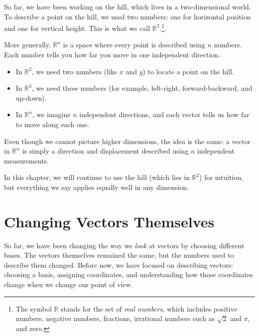 \documentclass[11pt,openany]{book}
\theoremstyle{definition}
\begin{document}
    \medskip
    
    So far, we have been working on the hill, which lives in a two-dimensional world. 
    To describe a point on the hill, we used two numbers: one for horizontal position 
    and one for vertical height. This is what we call $\mathbb{R}^2$.\footnote{The symbol 
$\mathbb{R}$ stands for the set of \textit{real numbers}, which includes positive 
numbers, negative numbers, fractions, irrational numbers such as $\sqrt{2}$ and $\pi$, 
and zero.}.

\medskip

More generally, $\mathbb{R}^n$ is a space where every point is described using $n$ 
numbers. Each number tells you how far you move in one independent direction.

\medskip

\begin{itemize}
  \item In $\mathbb{R}^2$, we need two numbers (like $x$ and $y$) to locate a point on the hill.
  \item In $\mathbb{R}^3$, we need three numbers (for example, left-right, forward-backward, and up-down).
  \item In $\mathbb{R}^n$, we imagine $n$ independent directions, and each vector tells us how far to move along each one.
\end{itemize}

\medskip

Even though we cannot picture higher dimensions, the idea is the same: 
a vector in $\mathbb{R}^n$ is simply a direction and displacement described using $n$ independent measurements.

\medskip

In this chapter, we will continue to use the hill (which lies in $\mathbb{R}^2$) 
for intuition, but everything we say applies equally well in any dimension.

\section{Changing Vectors Themselves}

So far, we have been changing the way we \textit{look} at vectors by choosing different bases. 
The vectors themselves remained the same, but the numbers used to describe them changed.
Before now, we have focused on describing vectors: choosing a basis, assigning coordinates, 
and understanding how those coordinates change when we change our point of view.
\end{document}
